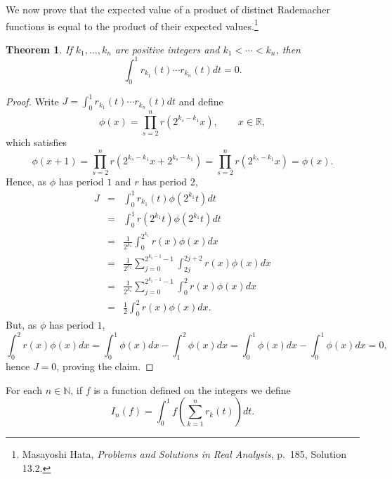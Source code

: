 \documentclass{article}
\newtheorem{theorem}{Theorem}
\theoremstyle{definition}
\begin{document}
We now prove that the expected value of a product of distinct Rademacher functions is equal to the product of their
expected values.\footnote{Masayoshi Hata, {\em Problems and Solutions in Real
Analysis}, p.~185, Solution 13.2.}

\begin{theorem}
If $k_1,\ldots,k_n$ are positive integers and $k_1<\cdots<k_n$, then
\[
\int_0^1 r_{k_1}(t) \cdots r_{k_n}(t) dt = 0.
\]
\label{independent}
\end{theorem}
\begin{proof}
Write $J=\int_0^1 r_{k_1}(t) \cdots r_{k_n}(t) dt$ and define
\[
\phi(x) = \prod_{s=2}^n r(2^{k_s-k_1}x), \qquad x \in \mathbb{R},
\]
which satisfies
\[
\phi(x+1)=\prod_{s=2}^n r(2^{k_s-k_1}x+2^{k_s-k_1})
=\prod_{s=2}^n r(2^{k_s-k_1}x)=\phi(x).
\]
Hence, as $\phi$ has period $1$ and $r$ has period $2$,
\begin{eqnarray*}
J &=& \int_0^1 r_{k_1}(t) \phi(2^{k_1}t) dt\\
& =& \int_0^1 r(2^{k_1}t) \phi(2^{k_1}t) dt \\
&=& \frac{1}{2^{k_1}} \int_0^{2^{k_1}} r(x) \phi(x) dx\\
&=&\frac{1}{2^{k_1}} \sum_{j=0}^{2^{k_1-1}-1} \int_{2j}^{2j+2} r(x) \phi(x) dx\\
&=&\frac{1}{2^{k_1}} \sum_{j=0}^{2^{k_1-1}-1} \int_0^2 r(x) \phi(x) dx\\
&=&\frac{1}{2} \int_0^2 r(x) \phi(x) dx.
\end{eqnarray*}
But, as $\phi$ has period $1$,
\[
 \int_0^2 r(x) \phi(x) dx = \int_0^1 \phi(x) dx - \int_1^2 \phi(x) dx =  \int_0^1 \phi(x) dx - \int_0^1 \phi(x) dx =0,
\]
hence  
$J=0$,
proving the claim.
\end{proof}

For each $n \in \mathbb{N}$, if $f$ is a function defined on the integers we define
\[
I_n(f) = \int_0^1 f\left( \sum_{k=1}^n r_k(t) \right) dt.
\]
\end{document}
